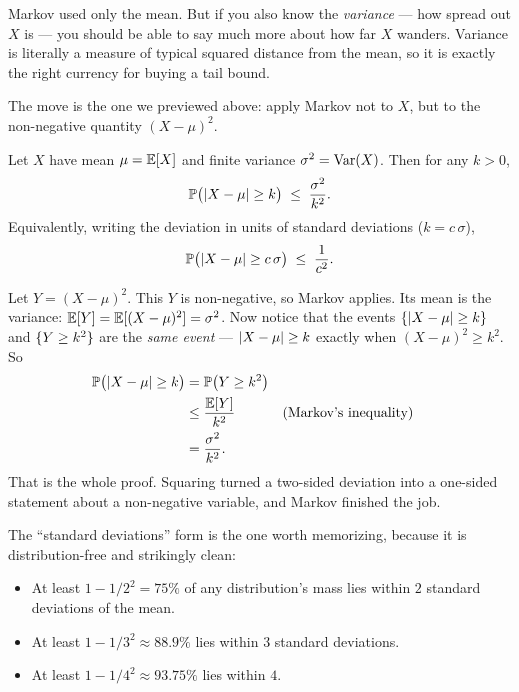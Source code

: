 Markov used only the mean. But if you also know the \emph{variance} --- how
spread out $X$ is --- you should be able to say much more about how far $X$
wanders. Variance is literally a measure of typical squared distance from the
mean, so it is exactly the right currency for buying a tail bound.

The move is the one we previewed above: apply Markov not to $X$, but to
the non-negative quantity $(X-\mu)^2$.

\begin{theorem}
\label{ch19:cheb-thm}
Let $X$ have mean $\mu = \operatorname{\mathbb{E}}[X]$ and finite variance $\sigma^2 = \operatorname{Var}(X)$. Then
for any $k > 0$,
\[
  \operatorname{\mathbb{P}}\bigl(\lvert X-\mu\rvert \ge k\bigr) \;\le\; \frac{\sigma^2}{k^2}.
\]
Equivalently, writing the deviation in units of standard deviations
($k = c\,\sigma$),
\[
  \operatorname{\mathbb{P}}\bigl(\lvert X-\mu\rvert \ge c\,\sigma\bigr) \;\le\; \frac{1}{c^2}.
\]
\end{theorem}

\begin{whybox}
Let $Y = (X-\mu)^2$. This $Y$ is non-negative, so Markov applies. Its mean is
the variance: $\operatorname{\mathbb{E}}[Y] = \operatorname{\mathbb{E}}[(X-\mu)^2] = \sigma^2$. Now notice that the events
$\{\lvert X-\mu\rvert\ge k\}$ and $\{Y \ge k^2\}$ are the \emph{same event} ---
$\lvert X-\mu\rvert\ge k$ exactly when $(X-\mu)^2 \ge k^2$. So
\begin{align*}
  \operatorname{\mathbb{P}}\bigl(\lvert X-\mu\rvert\ge k\bigr) &= \operatorname{\mathbb{P}}\bigl(Y \ge k^2\bigr) \\
  &\le \frac{\operatorname{\mathbb{E}}[Y]}{k^2} &&\text{(Markov's inequality)} \\
  &= \frac{\sigma^2}{k^2}.
\end{align*}
That is the whole proof. Squaring turned a two-sided deviation into a
one-sided statement about a non-negative variable, and Markov finished the
job.
\end{whybox}

The ``standard deviations'' form is the one worth memorizing, because it is
distribution-free and strikingly clean:

\begin{itemize}
  \item At least $1 - 1/2^2 = 75\%$ of any distribution's mass lies within
        $2$ standard deviations of the mean.
  \item At least $1 - 1/3^2 \approx 88.9\%$ lies within $3$ standard
        deviations.
  \item At least $1 - 1/4^2 \approx 93.75\%$ lies within $4$.
\end{itemize}

